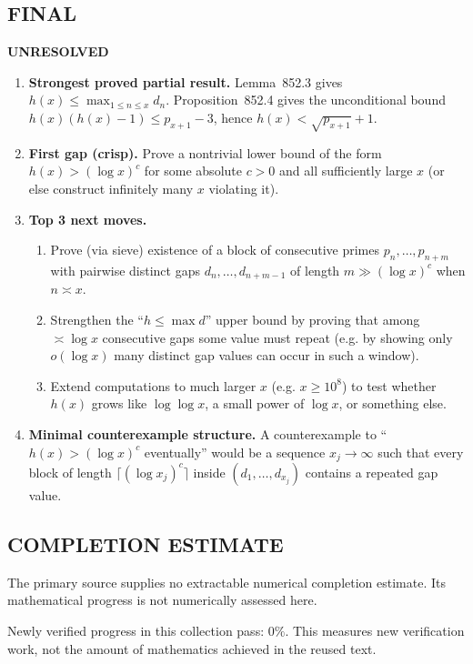 \subsection*{FINAL}
\textbf{UNRESOLVED}
\begin{enumerate}
\item[(i)] \textbf{Strongest proved partial result.} Lemma~852.3 gives $h(x)\le\max_{1\le n\le x} d_n$. Proposition~852.4 gives the unconditional bound $h(x)(h(x)-1)\le p_{x+1}-3$, hence $h(x)<\sqrt{p_{x+1}}+1$.
\item[(ii)] \textbf{First gap (crisp).} Prove a nontrivial lower bound of the form $h(x)>(\log x)^c$ for some absolute $c>0$ and all sufficiently large $x$ (or else construct infinitely many $x$ violating it).
\item[(iii)] \textbf{Top 3 next moves.}
  \begin{enumerate}
  \item Prove (via sieve) existence of a block of consecutive primes $p_n,\dots,p_{n+m}$ with pairwise distinct gaps $d_n,\dots,d_{n+m-1}$ of length $m\gg (\log x)^c$ when $n\asymp x$.
  \item Strengthen the ``$h\le\max d$'' upper bound by proving that among $\asymp\log x$ consecutive gaps some value must repeat (e.g. by showing only $o(\log x)$ many distinct gap values can occur in such a window).
  \item Extend computations to much larger $x$ (e.g. $x\ge 10^8$) to test whether $h(x)$ grows like $\log\log x$, a small power of $\log x$, or something else.
  \end{enumerate}
\item[(iv)] \textbf{Minimal counterexample structure.} A counterexample to ``$h(x)>(\log x)^c$ eventually'' would be a sequence $x_j\to\infty$ such that every block of length $\lceil(\log x_j)^c\rceil$ inside $(d_1,\dots,d_{x_j})$ contains a repeated gap value.
\end{enumerate}



\subsection*{COMPLETION ESTIMATE}
The primary source supplies no extractable numerical completion estimate. Its mathematical progress is not numerically assessed here.

Newly verified progress in this collection pass: $0\%$. This measures new verification work, not the amount of mathematics achieved in the reused text.
